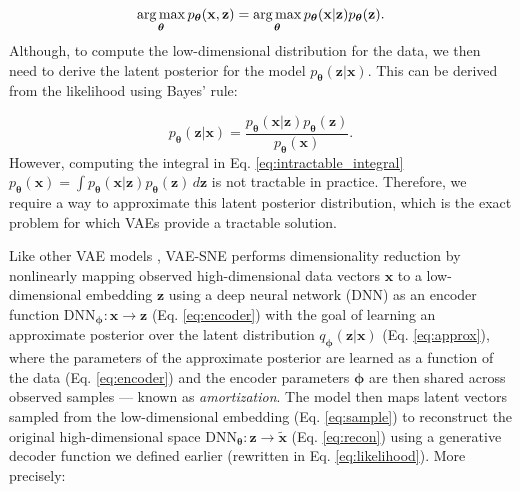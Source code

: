 \begin{equation}
     \operatorname*{arg\,max}_{\boldsymbol{\theta}} p_{\boldsymbol{\theta}}(\mathbf{x}, \mathbf{z}) = \operatorname*{arg\,max}_{\boldsymbol{\theta}} p_{\boldsymbol{\theta}}(\mathbf{x} | \mathbf{z})p_{\boldsymbol{\theta}}(\mathbf{z}).
\end{equation}
Although, to compute the low-dimensional distribution for the data, we then need to derive the latent posterior for the model $p_{\boldsymbol{\theta}}(\mathbf{z} | \mathbf{x})$. This can be derived from the likelihood using Bayes' rule:

\begin{equation}
      p_{\boldsymbol{\theta}}(\mathbf{z}|\mathbf{x}) = \frac{p_{\boldsymbol{\theta}}(\mathbf{x} | \mathbf{z})p_{\boldsymbol{\theta}}(\mathbf{z})} {p_{\boldsymbol{\theta}}(\mathbf{x})}.
      \label{eq:intractable_integral}
\end{equation}
However, computing the integral in Eq. \ref{eq:intractable_integral} $p_{\boldsymbol{\theta}}(\mathbf{x}) = \int p_{\boldsymbol{\theta}}(\mathbf{x} | \mathbf{z})p_{\boldsymbol{\theta}}(\mathbf{z})\, d\mathbf{z}$ is not tractable in practice. Therefore, we require a way to approximate this latent posterior distribution, which is the exact problem for which VAEs provide a tractable solution.

Like other VAE models \citep{kingma2013vae, kingma2014semi, burda2015iwae, dilokthanakul2016gmvae, ding2018scvis, dieng2019avoiding}, VAE-SNE performs dimensionality reduction by nonlinearly mapping observed high-dimensional data vectors $\mathbf{x}$ to a low-dimensional embedding $\mathbf{z}$ using a deep neural network ($\mathrm{DNN}$) as an encoder function $\mathrm{DNN}_{\boldsymbol{\phi}} : \mathbf{x} \to \mathbf{z}$ (Eq. \ref{eq:encoder}) with the goal of learning an approximate posterior over the latent distribution $q_{\boldsymbol{\phi}}(\mathbf{z} | \mathbf{x})$ (Eq. \ref{eq:approx}), where the parameters of the approximate posterior are learned as a function of the data (Eq. \ref{eq:encoder}) and the encoder parameters $\boldsymbol{\phi}$ are then shared across observed samples --- known as \textit{amortization}. The model then maps latent vectors sampled from the low-dimensional embedding (Eq. \ref{eq:sample}) to reconstruct the original high-dimensional space $\mathrm{DNN}_{\boldsymbol{\theta}} : \mathbf{z} \to \tilde{\mathbf{x}}$ (Eq. \ref{eq:recon}) using a generative decoder function we defined earlier (rewritten in Eq. \ref{eq:likelihood}). More precisely:


